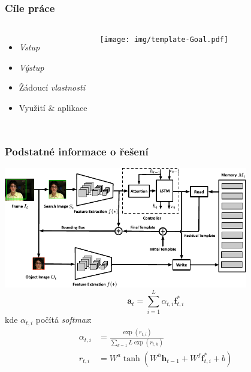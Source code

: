 \documentclass[]{fitthesispresn}
\begin{document}
    \begin{frame}
        \frametitle{Cíle práce}
        \begin{columns}
            \begin{itemize}
                \item \emph{Vstup}
                \item \emph{Výstup}
                \item Žádoucí \emph{vlastnosti}
                \item Využití \& aplikace
            \end{itemize}

            \texttt{[image: img/template-Goal.pdf]}
        \end{columns}
    \end{frame}

    \begin{frame}
        \frametitle{Podstatné informace o řešení}
        \centering\includegraphics[width=0.8\textwidth]{img/template-Schema.pdf}
        \begin{equation}
            \mathbf{a}_t = \sum_{i=1}^{L}\alpha_{t,i}\mathbf{f}_{t,i}^{*}
        \end{equation}
        kde $\alpha_{t,i}$ počítá \emph{softmax}:
        \begin{align}
            \alpha_{t,i} & = \frac{\exp(r_{t,i})}{\sum_{k=1}{L}\exp(r_{t,k})}
            \\
            r_{t,i}      & = W^a \tanh\left( W^h \mathbf{h}_{t-1} + W^f\mathbf{f}_{t,i}^{*} + b \right)
        \end{align}
    \end{frame}
\end{document}
